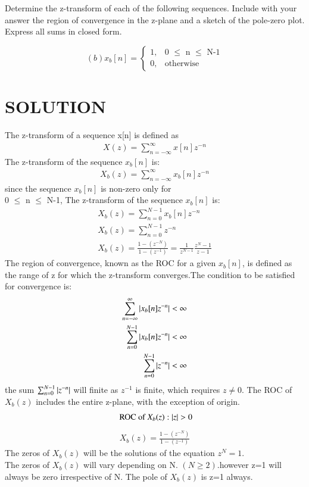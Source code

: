 \documentclass[journal,12pt,twocolumn]{IEEEtran}
\begin{document}
\begin{enumerate}
Determine the z-transform of each of the following sequences. Include with your answer the region of convergence in the z-plane and a sketch of the pole-zero plot. Express all sums in closed form.

\begin{equation*}
(b) x_b[n]=
\begin{cases}
      1, & \text{0 $\leq$ n $\leq$ N-1}\\
      0, & \text{otherwise}
    \end{cases}       
\end{equation*}

\section*{SOLUTION}
The z-transform of a sequence x[n] is defined as
\begin{align}
   X(z) = \sum_{n= -\infty}^{\infty} x[n] z^{-n} 
\end{align}
The z-transform of the sequence $x_b [n] $ is:
\begin{align}
   X_b(z) = \sum_{n= -\infty}^{\infty} x_b[n] z^{-n} 
\end{align}
since the sequence $x_b [n] $ is non-zero only for \\
0 $\leq$ n $\leq$ N-1, The z-transform of the sequence $x_b [n] $ is:
\begin{align}
X_b(z) = \sum_{n=0}^{N-1} x_b[n] z^{-n} \\
X_b(z) = \sum_{n=0}^{N-1} z^{-n} \\
X_b(z)= \frac{1-(z^{-N})}{1-(z^{-1})} = \frac{1}{z^{N-1}}\frac{z^N-1}{z-1}
\end{align}
The region of convergence, known as the ROC for a given  $x_b[n]$, is defined as the range of  z  for which the z-transform converges.The condition to be satisfied for convergence is:
\begin{align}
    \sum_{n=-\infty}^{\infty} \vert x_b[n] z^{-n} \vert < \infty\\
     \sum_{n=0}^{N-1} \vert x_b[n] z^{-n} \vert < \infty\\
     \sum_{n=0}^{N-1} \vert z^{-n} \vert < \infty
\end{align}
the sum $\sum_{n=0}^{N-1} \vert z^{-n} \vert$ will finite as $z^{-1}$ is finite, which requires $z\neq 0$. The ROC of $X_b(z)$ includes the entire z-plane, with the exception of origin.
\begin{align*}
   \text{ ROC of } X_b(z): \vert z\vert>0 
\end{align*}
\begin{align}
 X_b(z)= \frac{1-(z^{-N})}{1-(z^{-1})}   
\end{align}
The zeros of $X_b(z)$ will be the solutions of the equation $z^N=1$.\\The zeros of $X_b(z)$ will vary depending on N. $(N \geq 2)$.however z=1 will always be zero irrespective of N.
The pole of $X_b(z)$ is z=1 always.


\end{enumerate}
\end{document}
